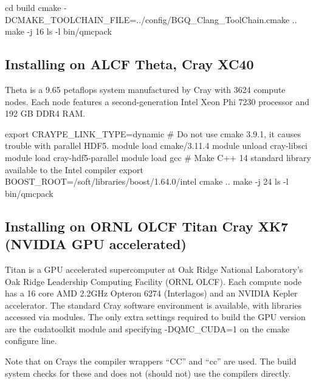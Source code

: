 %
\begin{shade}
cd build
cmake -DCMAKE_TOOLCHAIN_FILE=../config/BGQ_Clang_ToolChain.cmake ..
make -j 16
ls -l bin/qmcpack
\end{shade}

\subsection{Installing on ALCF Theta, Cray XC40}
Theta is a 9.65 petaflops system manufactured by Cray with 3624 compute nodes.
Each node features a second-generation Intel Xeon Phi 7230 processor and 192 GB DDR4 RAM.

%
\begin{shade}
export CRAYPE_LINK_TYPE=dynamic
# Do not use cmake 3.9.1, it causes trouble with parallel HDF5.
module load cmake/3.11.4
module unload cray-libsci
module load cray-hdf5-parallel
module load gcc   # Make C++ 14 standard library available to the Intel compiler
export BOOST_ROOT=/soft/libraries/boost/1.64.0/intel
cmake ..
make -j 24
ls -l bin/qmcpack
\end{shade}

\subsection{Installing on ORNL OLCF Titan Cray XK7 (NVIDIA GPU
  accelerated)}
\label{sec:titanbuildgpu}
Titan is a GPU accelerated supercomputer at Oak Ridge National
Laboratory's  Oak Ridge Leadership Computing Facility  (ORNL OLCF). Each
compute node has a 16 core AMD 2.2GHz Opteron 6274 (Interlagos) and an
NVIDIA Kepler accelerator. The standard Cray software environment is
available, with libraries accessed via modules. The only extra
settings required to build the GPU version are the cudatoolkit module
and specifying -DQMC\_CUDA=1 on the cmake configure line.

Note that on Crays the compiler wrappers ``CC'' and ``cc'' are
used. The build system checks for these and does not (should not) use
the compilers directly.

%

